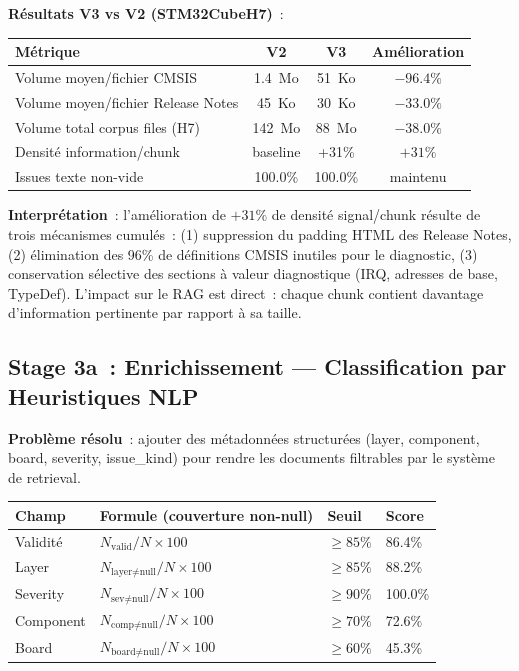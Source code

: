 \textbf{Résultats V3 vs V2 (STM32CubeH7)}~:

\begin{longtable}{p{5.5cm}ccc}
\toprule
\textbf{Métrique} & \textbf{V2} & \textbf{V3} & \textbf{Amélioration} \\
\midrule
Volume moyen/fichier CMSIS & 1.4~Mo & 51~Ko & $-96.4\%$ \\
Volume moyen/fichier Release Notes & 45~Ko & 30~Ko & $-33.0\%$ \\
Volume total corpus files (H7) & 142~Mo & 88~Mo & $-38.0\%$ \\
Densité information/chunk & baseline & +31\% & $+31\%$ \\
Issues texte non-vide & 100.0\% & 100.0\% & maintenu \\
\bottomrule
\end{longtable}

\textbf{Interprétation}~: l'amélioration de $+31\%$ de densité signal/chunk résulte de trois mécanismes cumulés~: (1) suppression du padding HTML des Release Notes, (2) élimination des 96\% de définitions CMSIS inutiles pour le diagnostic, (3) conservation sélective des sections à valeur diagnostique (IRQ, adresses de base, TypeDef). L'impact sur le RAG est direct~: chaque chunk contient davantage d'information pertinente par rapport à sa taille.

\subsection{Stage 3a~: Enrichissement --- Classification par Heuristiques NLP}
\label{sec:eval_stage3a}

\textbf{Problème résolu}~: ajouter des métadonnées structurées (layer, component, board, severity, issue\_kind) pour rendre les documents filtrables par le système de retrieval.

\begin{longtable}{p{3.5cm}p{5.5cm}p{2cm}p{2cm}}
\toprule
\textbf{Champ} & \textbf{Formule (couverture non-null)} & \textbf{Seuil} & \textbf{Score} \\
\midrule
Validité & $N_{\text{valid}}/N \times 100$ & $\geq 85\%$ & 86.4\% \\
Layer & $N_{\text{layer}\neq\text{null}}/N \times 100$ & $\geq 85\%$ & 88.2\% \\
Severity & $N_{\text{sev}\neq\text{null}}/N \times 100$ & $\geq 90\%$ & 100.0\% \\
Component & $N_{\text{comp}\neq\text{null}}/N \times 100$ & $\geq 70\%$ & 72.6\% \\
Board & $N_{\text{board}\neq\text{null}}/N \times 100$ & $\geq 60\%$ & 45.3\% \\
\bottomrule
\end{longtable}

